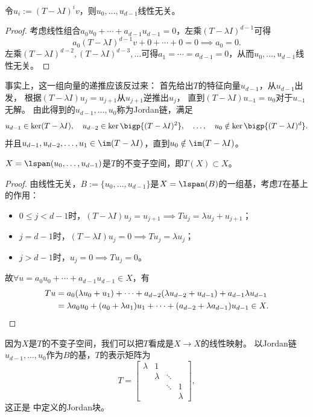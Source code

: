 \begin{theorem}{}{}
	令$u_i:=(T-\lambda I)^iv$，则$u_0,\ldots,u_{d-1}$线性无关。
\end{theorem}

\begin{proof}
	考虑线性组合$a_0u_0+\cdots+a_{d-1}u_{d-1}=0$，左乘$(T-\lambda I)^{d-1}$可得
	\[
		a_0(T-\lambda I)^{d-1}v+0+\cdots+0=0\implies a_0=0.
	\]
	左乘$(T-\lambda I)^{d-2},(T-\lambda I)^{d-3},\ldots$可得$a_1=\cdots=a_{d-1}=0$，从而$u_0,\ldots,u_{d-1}$线性无关。
\end{proof}

\begin{remark}
	事实上，这一组向量的递推应该反过来：
	首先给出$T$的特征向量$u_{d-1}$，从$u_{d-1}$出发，
	根据$(T-\lambda I)u_j=u_{j+1}$从$u_{j+1}$逆推出$u_j$，
	直到$(T-\lambda I)u_{-1}=u_0$对于$u_{-1}$无解。
	由此得到的$u_{d-1},\ldots,u_0$称为Jordan链，满足
	\[
		u_{d-1}\in\ker(T-\lambda I),\quad
		u_{d-2}\in\ker\bigp{(T-\lambda I)^2},\quad
		\ldots,\quad
		u_0\notin\ker\bigp{(T-\lambda I)^d}.
	\]
	并且$u_{d-1},u_{d-2},\ldots,u_1\in\im(T-\lambda I)$，直到$u_0\notin\im(T-\lambda I)$。
\end{remark}

\begin{theorem}{}{}
	$X=\lspan(u_0,\ldots,u_{d-1})$是$T$的不变子空间，即$T(X)\subset X$。
\end{theorem}

\begin{proof}
	由线性无关，$B:=\{u_0,\ldots,u_{d-1}\}$是$X=\lspan(B)$的一组基，考虑$T$在基上的作用：
	\begin{itemize}
		\item $0\leq j< d-1$时，$(T-\lambda I)u_j=u_{j+1}\implies Tu_j=\lambda u_j+u_{j+1}$；
		\item $j=d-1$时，$(T-\lambda I)u_j=0\implies Tu_j=\lambda u_j$；
		\item $j>d-1$时，$u_j=0\implies Tu_j=0$。
	\end{itemize}
	故$\forall u=a_0u_0+\cdots+a_{d-1}u_{d-1}\in X$，有
	\begin{align*}
		Tu&=a_0(\lambda u_0+u_1)+\cdots+a_{d-2}(\lambda u_{d-2}+u_{d-1})+a_{d-1}\lambda u_{d-1}\\
		&=\lambda a_0u_0+(a_0+\lambda a_1)u_1+\cdots+(a_{d-2}+\lambda a_{d-1})u_{d-1}\in X.
		\qedhere
	\end{align*}
\end{proof}

\begin{corollary}
	因为$X$是$T$的不变子空间，我们可以把$T$看成是$X\to X$的线性映射。
	以Jordan链$u_{d-1},\ldots,u_0$作为$B$的基，$T$的表示矩阵为
	\[
		T=\begin{bmatrix}
			\lambda&1\\ &\lambda&\ddots\\ &&\ddots&1\\ &&&\lambda
		\end{bmatrix},
	\]
	这正是 中定义的Jordan块。
\end{corollary}

